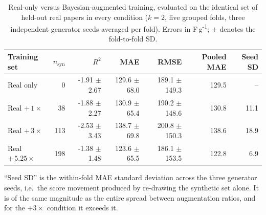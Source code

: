 \begin{table}[htbp]
\centering
\caption{Real-only versus Bayesian-augmented training, evaluated on the identical set of held-out real papers in every condition ($k=2$, five grouped folds, three independent generator seeds averaged per fold). Errors in F\,g\textsuperscript{-1}; $\pm$ denotes the fold-to-fold SD.}
\label{tab:augmentation}
\footnotesize
\begin{tabular}{lrrrrrr}
\toprule
\textbf{Training set} & \textbf{$n_{\mathrm{syn}}$} & \textbf{$R^2$} & \textbf{MAE} & \textbf{RMSE} & \textbf{Pooled MAE} & \textbf{Seed SD} \\
\midrule
Real only & 0 & -1.91 $\pm$ 2.67 & 129.6 $\pm$ 68.0 & 189.1 $\pm$ 149.3 & 129.5 & -- \\
Real $+\,1\times$ & 38 & -1.88 $\pm$ 2.27 & 130.9 $\pm$ 65.4 & 190.2 $\pm$ 148.6 & 130.8 & 11.1 \\
Real $+\,3\times$ & 113 & -2.53 $\pm$ 3.43 & 138.7 $\pm$ 69.8 & 200.8 $\pm$ 150.3 & 138.6 & 18.9 \\
Real $+\,5.25\times$ & 198 & -1.38 $\pm$ 1.48 & 123.6 $\pm$ 65.5 & 186.1 $\pm$ 153.5 & 122.8 & 6.9 \\
\bottomrule
\end{tabular}
\par\vspace{2pt}\begin{minipage}{\linewidth}\scriptsize ``Seed SD'' is the within-fold MAE standard deviation across the three generator seeds, i.e.\ the score movement produced by re-drawing the synthetic set alone. It is of the same magnitude as the entire spread between augmentation ratios, and for the $+3\times$ condition it exceeds it.\end{minipage}
\end{table}
